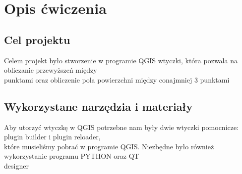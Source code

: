 \section{Opis ćwiczenia}
\subsection{Cel projektu}
Celem projekt było stworzenie w programie QGIS wtyczki, która pozwala na obliczanie przewyższeń między \\punktami oraz obliczenie pola powierzchni między conajmniej 3 punktami
\subsection{Wykorzystane narzędzia i materiały}
Aby utorzyć wtyczkę w QGIS potrzebne nam były dwie wtyczki pomocnicze: plugin builder i plugin reloader, \\które musieliśmy pobrać w programie QGIS. Niezbędne było również wykorzystanie programu PYTHON oraz QT \\designer